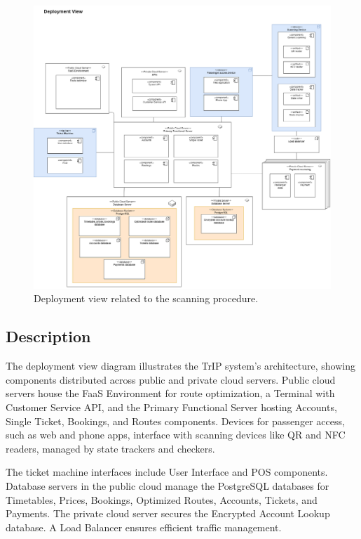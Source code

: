 \begin{figure}[H]
    \centering
    \includegraphics[width=\textwidth]{drawings/views_final_version/deployment_view.png}
    \caption{Deployment view related to the scanning procedure.}
    \label{fig:deployment_view_scanning}
\end{figure}

\subsection*{Description}
The deployment view diagram illustrates the TrIP system's architecture, showing components distributed across public and private cloud servers. Public cloud servers house the FaaS Environment for route optimization, a Terminal with Customer Service API, and the Primary Functional Server hosting Accounts, Single Ticket, Bookings, and Routes components. Devices for passenger access, such as web and phone apps, interface with scanning devices like QR and NFC readers, managed by state trackers and checkers.

The ticket machine interfaces include User Interface and POS components. Database servers in the public cloud manage the PostgreSQL databases for Timetables, Prices, Bookings, Optimized Routes, Accounts, Tickets, and Payments. The private cloud server secures the Encrypted Account Lookup database. A Load Balancer ensures efficient traffic management.

